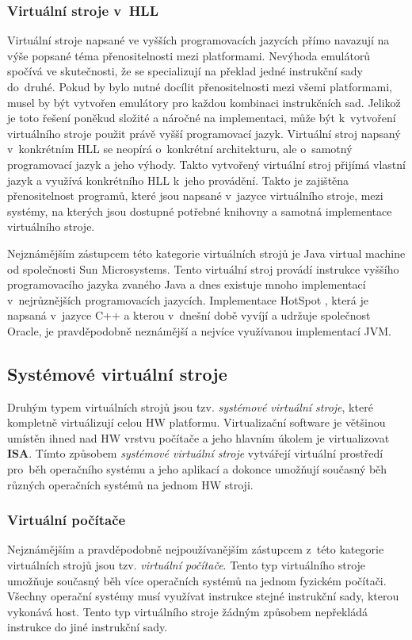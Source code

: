 \subsubsection{Virtuální stroje v~HLL}
\label{chapter:virtualization:clasification:process_vm:hll_vm}
Virtuální stroje napsané ve vyšších programovacích jazycích přímo navazují na výše popsané téma přenositelnosti mezi platformami.
Nevýhoda emulátorů spočívá ve skutečnosti, že se specializují na překlad jedné instrukční sady do~druhé. Pokud by bylo nutné 
docílit přenositelnosti mezi všemi platformami, musel by být vytvořen emulátory pro každou kombinaci instrukčních sad. Jelikož
je toto řešení poněkud složité a náročné na implementaci, může být k~vytvoření virtuálního stroje použit právě vyšší programovací 
jazyk. Virtuální stroj napsaný v~konkrétním HLL se neopírá o~konkrétní architekturu, ale o~samotný programovací jazyk a jeho výhody.
Takto vytvořený virtuální stroj přijímá vlastní jazyk a využívá konkrétního HLL k~jeho provádění. Takto je zajištěna přenositelnost
programů, které jsou napsané v~jazyce virtuálního stroje, mezi systémy, na kterých jsou dostupné potřebné knihovny a samotná implementace virtuálního stroje.

Nejznámějším zástupcem této kategorie virtuálních strojů je Java virtual machine od společnosti Sun Microsystems. Tento virtuální
stroj provádí instrukce vyššího programovacího jazyka zvaného Java a dnes existuje mnoho implementací v~nejrůznějších programovacích
jazycích. Implementace HotSpot \cite{article:java:hotspot}, která je napsaná v~jazyce C++ a kterou v~dnešní době vyvíjí a 
udržuje společnost Oracle, je pravděpodobně neznámější a nejvíce využívanou implementací JVM.   
\subsection{Systémové virtuální stroje}
\label{chapter:virtualization:clasification:system_vm}
Druhým typem virtuálních strojů jsou tzv. \textit{systémové virtuální stroje}, které kompletně virtuálizují celou HW platformu.
Virtualizační software je většinou umístěn ihned nad HW vrstvu počítače a jeho hlavním úkolem je virtualizovat \textbf{ISA}. Tímto
způsobem \textit{systémové virtuální stroje} vytvářejí virtuální prostředí pro~běh operačního systému a jeho aplikací a dokonce
umožňují současný běh různých operačních systémů na jednom HW stroji.
\subsubsection{Virtuální počítače}
\label{chapter:virtualization:clasification:system_vm:virtual_computer}
Nejznámějším a pravděpodobně nejpoužívanějším zástupcem z~této kategorie virtuálních strojů jsou tzv. \textit{virtuální počítače}.
Tento typ virtuálního stroje umožňuje současný běh více operačních systémů na jednom fyzickém počítači. Všechny operační systémy
musí využívat instrukce stejné instrukční sady, kterou vykonává host. Tento typ virtuálního stroje žádným způsobem
nepřekládá instrukce do jiné instrukční sady.

